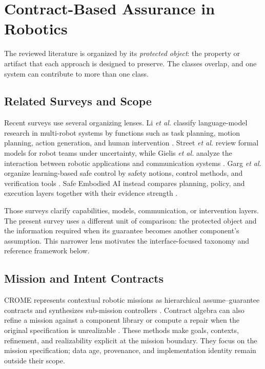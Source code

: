 \section{Contract-Based Assurance in Robotics}
\label{sec:related-work}

The reviewed literature is organized by its \emph{protected object}: the
property or artifact that each approach is designed to preserve.  The classes
overlap, and one system can contribute to more than one class.

\subsection{Related Surveys and Scope}

Recent surveys use several organizing lenses.  Li \emph{et al.} classify
language-model research in multi-robot systems by functions such as task
planning, motion planning, action generation, and human intervention
\cite{li2026llmmrs}.  Street \emph{et al.} review formal models for robot teams
under uncertainty, while Gielis \emph{et al.} analyze the interaction between
robotic applications and communication systems
\cite{street2023formal,gielis2022communications}.  Garg \emph{et al.} organize
learning-based safe control by safety notions, control methods, and verification
tools \cite{garg2024safecontrol}.  Safe Embodied AI instead compares planning,
policy, and execution layers together with their evidence strength
\cite{kim2026safeembodied}.

Those surveys clarify capabilities, models, communication, or intervention
layers.  The present survey uses a different unit of comparison: the protected
object and the information required when its guarantee becomes another
component's assumption.  This narrower lens motivates the interface-focused
taxonomy and reference framework below.

\subsection{Mission and Intent Contracts}

CROME represents contextual robotic missions as hierarchical assume--guarantee
contracts and synthesizes sub-mission controllers
\cite{mallozzi2020crome,mallozzi2023contextual}.  Contract algebra can also
refine a mission against a component library or compute a repair when the
original specification is unrealizable \cite{mallozzi2022repair}.  These methods
make goals, contexts, refinement, and realizability explicit at the mission
boundary.  They focus on the mission specification; data age, provenance, and
implementation identity remain outside their scope.

